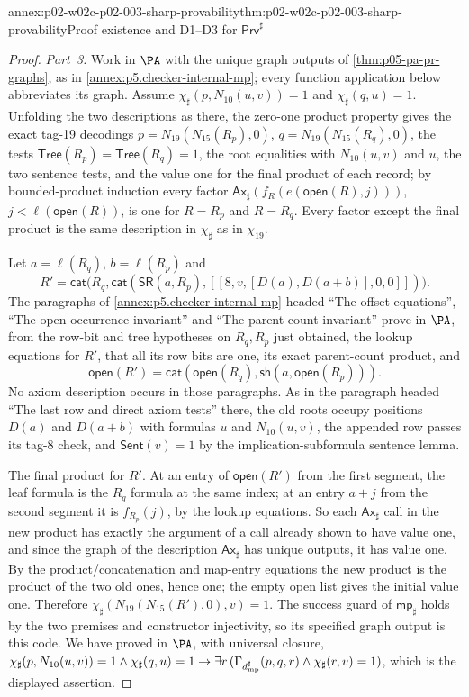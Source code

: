 \begin{annexitem}{annex:p02-w02c-p02-003-sharp-provability}{thm:p02-w02c-p02-003-sharp-provability}{Proof existence and D1--D3 for \(\mathsf{Prv}^{\sharp}\)}
\begin{proof}
\emph{Part~3.}  Work in \(\PA\) with the unique graph outputs of
\cref{thm:p05-pa-pr-graphs}, as in \cref{annex:p5.checker-internal-mp};
every function application below abbreviates its graph.  Assume
\(\chi_{\sharp}(p,N_{10}(u,v))=1\) and \(\chi_{\sharp}(q,u)=1\).  Unfolding
the two descriptions as there, the zero-one product property gives the exact
tag-19 decodings \(p=N_{19}(N_{15}(R_p),0)\), \(q=N_{19}(N_{15}(R_q),0)\), the
tests \(\mathsf{Tree}(R_p)=\mathsf{Tree}(R_q)=1\), the root equalities with
\(N_{10}(u,v)\) and \(u\), the two sentence tests, and the value one for the
final product of each record; by bounded-product induction every factor
\(\mathsf{Ax}_{\sharp}(f_{R}(e(\mathsf{open}(R),j)))\), \(j<\ell(\mathsf{open}(R))\),
is one for \(R=R_p\) and \(R=R_q\).  Every factor except the final product is
the same description in \(\chi_{\sharp}\) as in \(\chi_{19}\).

Let \(a=\ell(R_q)\), \(b=\ell(R_p)\) and
\[
 R'=\mathsf{cat}\bigl(R_q,\mathsf{cat}(\mathsf{SR}(a,R_p),
 [[8,v,[D(a),D(a+b)],0,0]])\bigr).
\]  The paragraphs of
\cref{annex:p5.checker-internal-mp} headed ``The offset equations'', ``The
open-occurrence invariant'' and ``The parent-count invariant'' prove in
\(\PA\), from the row-bit and tree hypotheses on \(R_q,R_p\) just obtained,
the lookup equations for \(R'\), that all its row bits are one, its exact
parent-count product, and
\[
 \mathsf{open}(R')=\mathsf{cat}(\mathsf{open}(R_q),
                       \mathsf{sh}(a,\mathsf{open}(R_p))).
\]
No axiom description occurs in those paragraphs.  As in the paragraph
headed ``The last row and direct axiom tests'' there, the old roots occupy
positions \(D(a)\) and \(D(a+b)\) with formulas \(u\) and \(N_{10}(u,v)\),
the appended row passes its tag-8 check, and
\(\mathsf{Sent}(v)=1\) by the implication-subformula sentence lemma.

The final product for \(R'\).  At an entry of \(\mathsf{open}(R')\) from the
first segment, the leaf formula is the \(R_q\) formula at the same index; at
an entry \(a+j\) from the second segment it is \(f_{R_p}(j)\), by the lookup
equations.  So each \(\mathsf{Ax}_{\sharp}\) call in the new product has
exactly the argument of a call already shown to have value one, and since
the graph of the description \(\mathsf{Ax}_{\sharp}\) has unique outputs,
it has value one.  By the product/concatenation and map-entry equations the
new product is the product of the two old ones, hence one; the empty open
list gives the initial value one.  Therefore
\(\chi_{\sharp}(N_{19}(N_{15}(R'),0),v)=1\).  The success guard of
\(\mathsf{mp}_{\sharp}\) holds by the two premises and constructor
injectivity, so its specified graph output is this code.  We have proved in
\(\PA\), with universal closure,
\(\chi_{\sharp}(p,N_{10}(u,v))=1\land\chi_{\sharp}(q,u)=1\to\exists r\,
(\Gamma_{d^{\sharp}_{\rm mp}}(p,q,r)\land\chi_{\sharp}(r,v)=1)\), which is the
displayed assertion.


\end{proof}
\end{annexitem}
